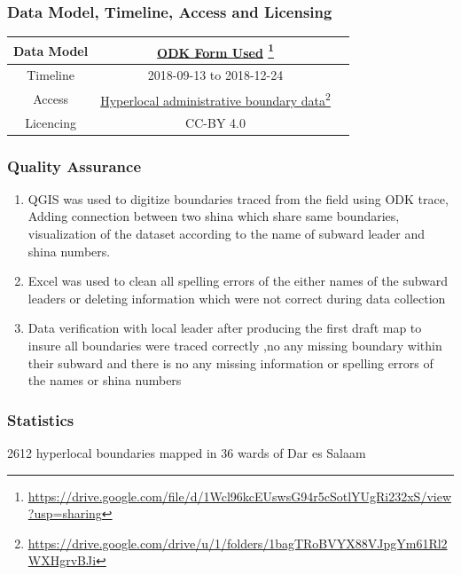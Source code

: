 \documentclass[a4paper,12pt,twoside]{article}
\begin{document}
\subsubsection{Data Model, Timeline, Access and Licensing}
\begin{center}
\begin{tabular}{|c|c|c|}  
 \hline
Data Model &
        \href{https://drive.google.com/file/d/1Wcl96kcEUswsG94r5cSotlYUgRi232xS/view?usp=sharing}{ODK Form Used} \footnote{\url{https://drive.google.com/file/d/1Wcl96kcEUswsG94r5cSotlYUgRi232xS/view?usp=sharing}} \\
 \hline
  Timeline  &  2018-09-13 to 2018-12-24 \\
\hline  
 Access  & 
    \href{https://drive.google.com/drive/u/1/folders/1bagTRoBVYX88VJpgYm61Rl2WXHgrvBJi}{Hyperlocal administrative boundary data}\footnote{\url{https://drive.google.com/drive/u/1/folders/1bagTRoBVYX88VJpgYm61Rl2WXHgrvBJi}} \\
   
\hline 
    Licencing & CC-BY 4.0 \\
\hline
\end{tabular}
\end{center}

\subsubsection{Quality Assurance}
\begin{enumerate}
    \item QGIS was used to digitize boundaries traced from the field using ODK trace, Adding connection between two shina which share same boundaries, visualization of the dataset according to the name of subward leader and shina numbers. 
    \item Excel was used to clean all spelling errors of the either names of the subward leaders or deleting information which were not correct during data collection 
    \item Data verification with local leader after producing the first draft map  to insure all boundaries were traced correctly ,no any missing boundary within their subward and  there is no any missing information or spelling errors of the names or shina numbers 

\end{enumerate}

\subsubsection{Statistics}
2612 hyperlocal boundaries mapped in 36 wards of Dar es Salaam
\end{document}
